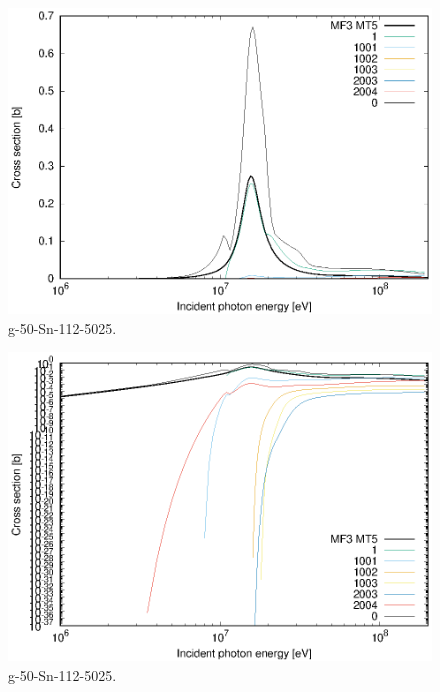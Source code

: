 \begin{figure}
 \includegraphics[width=\linewidth]{eps/g_50-Sn-112_5025.eps}
  \caption{g-50-Sn-112-5025.}
\end{figure}
\begin{figure}
 \includegraphics[width=\linewidth]{eps-log/g_50-Sn-112_5025.eps}
 \caption{g-50-Sn-112-5025.}
\end{figure}
\newpage \clearpage

